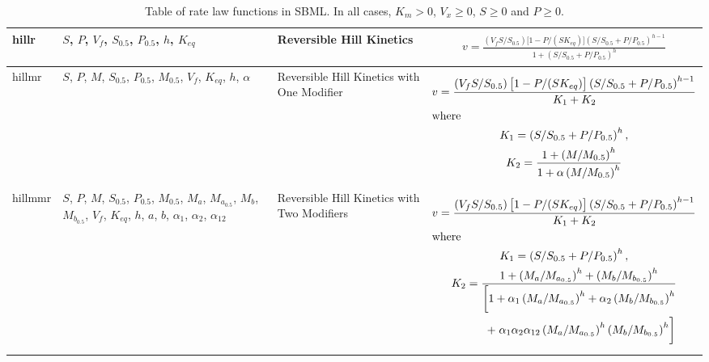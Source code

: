 \documentclass[10pt]{cekarticle}
\newcommand{\changed}[1]{\textcolor{BrickRed}{#1}}
\newenvironment{blockChanged}{\color{BrickRed}}{}
\begin{document}
\begin{table}[ht]
\begin{tabular}{|m{0.5in}|>{\raggedright}m{0.7in}|>{\raggedright}m{1.2in}|m{3.2in}|}
hillr & $S$, $P$, $V_f$, $S_{0.5}$, $P_{0.5}$, $h$, $K_{eq}$ & Reversible
Hill Kinetics &
\begin{gather*}
v = \frac{\left(V_f S / S_{0.5}
\right) \bigl[ 1 - P / ( S K_{eq} ) \bigr]
\left(S / S_{0.5} + P / P_{0.5}\right)^{h-1}}{1 +
\left(S / S_{0.5} + P / P_{0.5}\right)^h}
\end{gather*}
\\ \hline

hillmr & \changed{$S$, $P$, $M$, $S_{0.5}$, $P_{0.5}$, $M_{0.5}$, $V_f$, $K_{eq}$, $h$, $\alpha$} & Reversible Hill
Kinetics with One Modifier &
\begin{gather*}
v = \frac{\left(V_f
S / S_{0.5} \right) \bigl[1 - P / ( S K_{eq} ) \bigr]
\left(S / S_{0.5} + P / P_{0.5}\right)^{h-1}} {K_1 +
K_2} \\
\intertext{where}
K_1 = \left(S / S_{0.5} +
P / P_{0.5}\right)^h, \\
K_2 = \frac{1 + \left(M / M_{0.5}\right)^h}{1
  + \alpha \left(M / M_{0.5}\right)^h}
\end{gather*}
\\ \hline

hillmmr & \changed{$S$, $P$, $M$, $S_{0.5}$, $P_{0.5}$, $M_{0.5}$, $M_a$, $M_{a_{0.5}}$, 
$M_b$, $M_{b_{0.5}}$, $V_f$, $K_{eq}$, $h$, $a$, $b$, $\alpha_1$, $\alpha_2$, $\alpha_{12}$} &
Reversible Hill Kinetics with Two Modifiers &
\begin{blockChanged}
\begin{gather*}
v = \frac{\left(V_f
S / S_{0.5} \right) \bigl[ 1 - P / (S K_{eq} ) \bigr]
\left(S / S_{0.5} + P / P_{0.5}\right)^{h-1}} {K_1 +
K_2} \\
\intertext{where}
K_1 = \left(S / S_{0.5} + P / P_{0.5}\right)^h ,\\
K_2 = \frac{1 + \left(M_a / M_{a_{0.5}}\right)^h + \left( M_b / M_{b_{0.5}}
\right)^h }{\begin{split}
\biggl[ 1 + \alpha_1 \left(M_a / M_{a_{0.5}}\right)^h +
\alpha_2 \left(M_b / M_{b_{0.5}}\right)^h \\
+\; \alpha_1 \alpha_2
\alpha_{12} \left( M_a / M_{a_{0.5}} \right)^h \left(
  M_b / M_{b_{0.5}} \right)^h \biggr] \end{split} }
\end{gather*}
\end{blockChanged}
\\ \hline

\end{tabular}
\caption{Table of rate law functions in SBML.  In all cases, $K_m > 0$, $V_x \geq 0$, $S
  \geq 0$ and $P \geq 0$.}
\label{tab:ratelaws}
\end{table}
\end{document}
